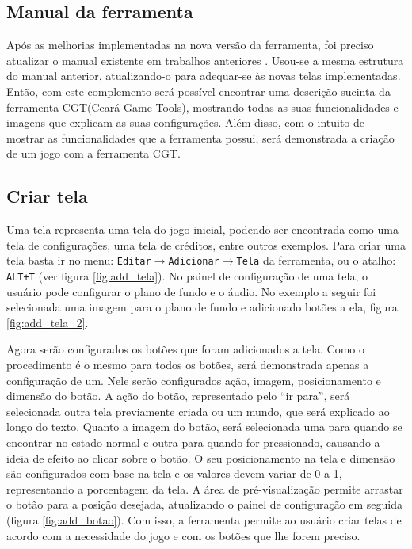 \documentclass[12pt,oneside,openright,a4paper,english,brazil,sumario=tradicional]{abntex2}
\begin{document}
\begin{anexosenv}
   \partanexos
   \chapter{Manual da ferramenta}
   \label{anex:manual-novo}

   Após as melhorias implementadas na nova versão da ferramenta, foi preciso atualizar o manual existente em trabalhos anteriores \cite{monografia:aquino}. Usou-se a mesma estrutura do manual anterior, atualizando-o para adequar-se às novas telas implementadas.
   Então, com este complemento será possível encontrar uma descrição sucinta da ferramenta CGT(Ceará Game Tools), mostrando todas as suas funcionalidades e imagens que explicam as suas configurações.
   Além disso, com o intuito de mostrar as funcionalidades que a ferramenta possui, será demonstrada a criação de um jogo com a ferramenta CGT.

   \section{Criar tela}
   Uma tela representa uma tela do jogo inicial, podendo ser encontrada como uma tela de configurações, uma tela de créditos, entre outros exemplos.
   Para criar uma tela basta ir no menu: \texttt{Editar$\rightarrow$Adicionar$\rightarrow$Tela} da ferramenta, ou o atalho: \texttt{ALT+T} (ver figura \ref{fig:add_tela}).
   No painel de configuração de uma tela, o usuário pode configurar o plano de fundo e o áudio.
   No exemplo a seguir foi selecionada uma imagem para o plano de fundo e adicionado botões a ela, figura \ref{fig:add_tela_2}.

   Agora serão configurados os botões que foram adicionados a tela.
   Como o procedimento é o mesmo para todos os botões, será demonstrada apenas a configuração de um. Nele serão configurados ação, imagem, posicionamento e dimensão do botão.
   A ação do botão, representado pelo “ir para”, será selecionada outra tela previamente criada ou um mundo, que será explicado ao longo do texto.
   Quanto a imagem do botão, será selecionada uma para quando se encontrar no estado normal e outra para quando for pressionado, causando a ideia de efeito ao clicar sobre o botão.
   O seu posicionamento na tela e dimensão são configurados com base na tela e os valores devem variar de 0 a 1, representando a porcentagem da tela. A área de pré-visualização permite arrastar o botão para a posição desejada, atualizando o painel de configuração em seguida (figura \ref{fig:add_botao}).
   Com isso, a ferramenta permite ao usuário criar telas de acordo com a necessidade do jogo e com os botões que lhe forem preciso.


\end{anexosenv}
\end{document}
